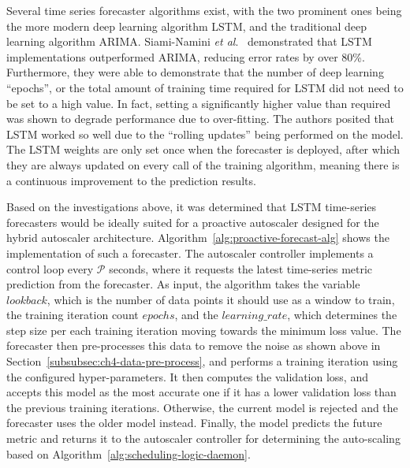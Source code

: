 Several time series forecaster algorithms exist, with the two prominent ones being the more modern deep learning algorithm LSTM, and the traditional deep learning algorithm ARIMA. Siami-Namini \textit{et al}.~\cite{siami2018comparison} demonstrated that LSTM implementations outperformed ARIMA, reducing error rates by over 80\%. Furthermore, they were able to demonstrate that the number of deep learning ``epochs'', or the total amount of training time required for LSTM did not need to be set to a high value. In fact, setting a significantly higher value than required was shown to degrade performance due to over-fitting. The authors posited that LSTM worked so well due to the ``rolling updates'' being performed on the model. The LSTM weights are only set once when the forecaster is deployed, after which they are always updated on every call of the training algorithm, meaning there is a continuous improvement to the prediction results.\par

Based on the investigations above, it was determined that LSTM time-series forecasters would be ideally suited for a proactive autoscaler designed for the hybrid autoscaler architecture. Algorithm~\ref{alg:proactive-forecast-alg} shows the implementation of such a forecaster. The autoscaler controller implements a control loop every $\mathcal{P}$ seconds, where it requests the latest time-series metric prediction from the forecaster. As input, the algorithm takes the variable $lookback$, which is the number of data points it should use as a window to train, the training iteration count $epochs$, and the $learning\_rate$, which determines the step size per each training iteration moving towards the minimum loss value. The forecaster then pre-processes this data to remove the noise as shown above in Section~\ref{subsubsec:ch4-data-pre-process}, and performs a training iteration using the configured hyper-parameters. It then computes the validation loss, and accepts this model as the most accurate one if it has a lower validation loss than the previous training iterations. Otherwise, the current model is rejected and the forecaster uses the older model instead. Finally, the model predicts the future metric and returns it to the autoscaler controller for determining the auto-scaling based on Algorithm~\ref{alg:scheduling-logic-daemon}.\par


